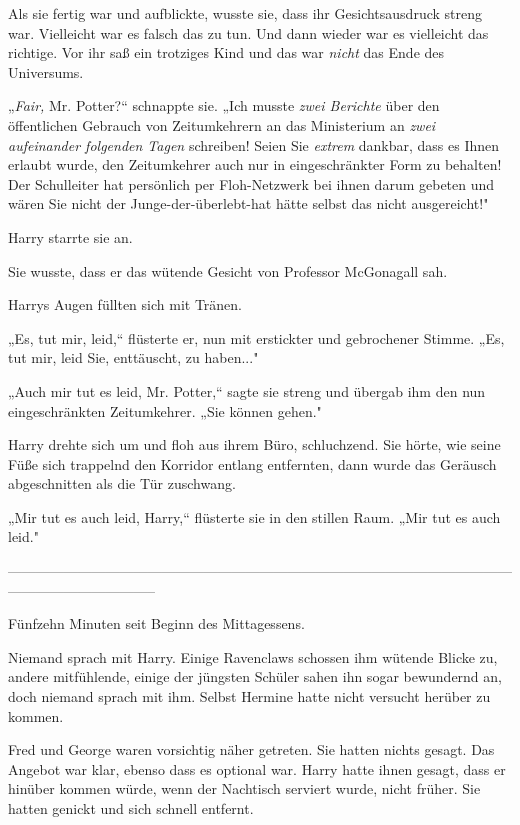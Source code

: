 {Als sie fertig war und aufblickte, wusste sie, dass ihr Gesichtsausdruck streng war. Vielleicht war es falsch das zu tun. Und dann wieder war es vielleicht das richtige. Vor ihr saß ein trotziges Kind und das war \emph{nicht} das Ende des Universums.

„\emph{Fair,} Mr. Potter?“ schnappte sie. „Ich musste \emph{zwei Berichte} über den öffentlichen Gebrauch von Zeitumkehrern an das Ministerium an \emph{zwei aufeinander folgenden Tagen} schreiben! Seien Sie \emph{extrem} dankbar, dass es Ihnen erlaubt wurde, den Zeitumkehrer auch nur in eingeschränkter Form zu behalten! Der Schulleiter hat persönlich per Floh-Netzwerk bei ihnen darum gebeten und wären Sie nicht der Junge-der-überlebt-hat hätte selbst das nicht ausgereicht!"

Harry starrte sie an.

Sie wusste, dass er das wütende Gesicht von Professor McGonagall sah.

Harrys Augen füllten sich mit Tränen.

„Es, tut mir, leid,“ flüsterte er, nun mit erstickter und gebrochener Stimme. „Es, tut mir, leid Sie, enttäuscht, zu haben..."

„Auch mir tut es leid, Mr. Potter,“ sagte sie streng und übergab ihm den nun eingeschränkten Zeitumkehrer. „Sie können gehen."

Harry drehte sich um und floh aus ihrem Büro, schluchzend. Sie hörte, wie seine Füße sich trappelnd den Korridor entlang entfernten, dann wurde das Geräusch abgeschnitten als die Tür zuschwang.

„Mir tut es auch leid, Harry,“ flüsterte sie in den stillen Raum. „Mir tut es auch leid."

--------------------------------------------------------------------------------------------------------------------------------------------

\hfill\break Fünfzehn Minuten seit Beginn des Mittagessens.

Niemand sprach mit Harry. Einige Ravenclaws schossen ihm wütende Blicke zu, andere mitfühlende, einige der jüngsten Schüler sahen ihn sogar bewundernd an, doch niemand sprach mit ihm. Selbst Hermine hatte nicht versucht herüber zu kommen.

Fred und George waren vorsichtig näher getreten. Sie hatten nichts gesagt. Das Angebot war klar, ebenso dass es optional war. Harry hatte ihnen gesagt, dass er hinüber kommen würde, wenn der Nachtisch serviert wurde, nicht früher. Sie hatten genickt und sich schnell entfernt.

}
